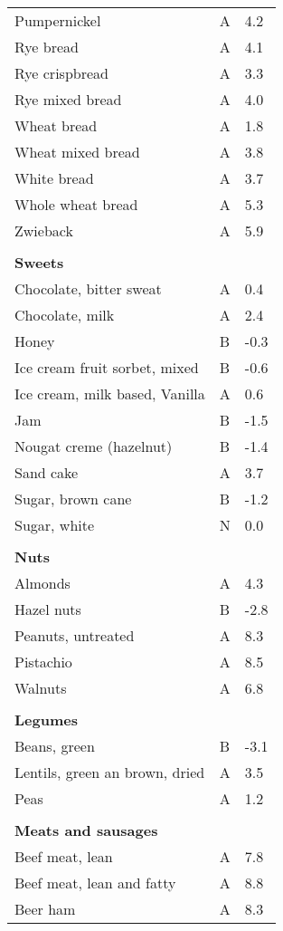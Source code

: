 \documentclass[../main.tex]{subfiles}
\begin{document}
\begin{longtable}{p{7cm}p{0.5cm}p{1cm}}
Pumpernickel  & A  & 4.2 \\
Rye bread  & A  & 4.1 \\
Rye crispbread  & A  & 3.3 \\
Rye mixed bread  & A  & 4.0 \\
Wheat bread  & A  & 1.8 \\
Wheat mixed bread  & A  & 3.8 \\
White bread  & A  & 3.7 \\
Whole wheat bread  & A  & 5.3 \\
Zwieback  & A  & 5.9 \\
 \\
\multicolumn{3}{l}{\textbf{Sweets}} \\
Chocolate, bitter sweat  & A  & 0.4 \\
Chocolate, milk  & A  & 2.4 \\
Honey  & B  & -0.3 \\
Ice cream fruit sorbet, mixed  & B  & -0.6 \\
Ice cream, milk based, Vanilla  & A  & 0.6 \\
Jam  & B  & -1.5 \\
Nougat creme (hazelnut)  & B  & -1.4 \\
Sand cake  & A  & 3.7 \\
Sugar, brown cane  & B  & -1.2 \\
Sugar, white  & N  & 0.0 \\
 \\
\multicolumn{3}{l}{\textbf{Nuts}} \\
Almonds  & A  & 4.3 \\
Hazel nuts  & B  & -2.8 \\
Peanuts, untreated  & A  & 8.3 \\
Pistachio  & A  & 8.5 \\
Walnuts  & A  & 6.8 \\
 \\
\multicolumn{3}{l}{\textbf{Legumes}} \\
Beans, green  & B  & -3.1 \\
Lentils, green an brown, dried  & A  & 3.5 \\
Peas  & A  & 1.2 \\
 \\
\multicolumn{3}{l}{\textbf{Meats and sausages}} \\
Beef meat, lean  & A  & 7.8 \\
Beef meat, lean and fatty  & A  & 8.8 \\
Beer ham  & A  & 8.3 \\

\end{longtable}
\end{document}
